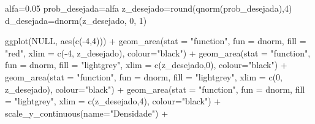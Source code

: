 \documentclass[
]{book}
\newenvironment{Shaded}{\begin{snugshade}}{\end{snugshade}}
\newcommand{\AttributeTok}[1]{\textcolor[rgb]{0.77,0.63,0.00}{#1}}
\newcommand{\ConstantTok}[1]{\textcolor[rgb]{0.00,0.00,0.00}{#1}}
\newcommand{\DecValTok}[1]{\textcolor[rgb]{0.00,0.00,0.81}{#1}}
\newcommand{\FloatTok}[1]{\textcolor[rgb]{0.00,0.00,0.81}{#1}}
\newcommand{\FunctionTok}[1]{\textcolor[rgb]{0.00,0.00,0.00}{#1}}
\newcommand{\NormalTok}[1]{#1}
\newcommand{\OtherTok}[1]{\textcolor[rgb]{0.56,0.35,0.01}{#1}}
\newcommand{\SpecialCharTok}[1]{\textcolor[rgb]{0.00,0.00,0.00}{#1}}
\newcommand{\StringTok}[1]{\textcolor[rgb]{0.31,0.60,0.02}{#1}}
\begin{document}
\begin{Shaded}
\begin{Highlighting}[]
\NormalTok{alfa}\OtherTok{=}\FloatTok{0.05}
\NormalTok{prob\_desejada}\OtherTok{=}\NormalTok{alfa}
\NormalTok{z\_desejado}\OtherTok{=}\FunctionTok{round}\NormalTok{(}\FunctionTok{qnorm}\NormalTok{(prob\_desejada),}\DecValTok{4}\NormalTok{)}
\NormalTok{d\_desejada}\OtherTok{=}\FunctionTok{dnorm}\NormalTok{(z\_desejado, }\DecValTok{0}\NormalTok{, }\DecValTok{1}\NormalTok{)}





\FunctionTok{ggplot}\NormalTok{(}\ConstantTok{NULL}\NormalTok{, }\FunctionTok{aes}\NormalTok{(}\FunctionTok{c}\NormalTok{(}\SpecialCharTok{{-}}\DecValTok{4}\NormalTok{,}\DecValTok{4}\NormalTok{))) }\SpecialCharTok{+}
  \FunctionTok{geom\_area}\NormalTok{(}\AttributeTok{stat =} \StringTok{"function"}\NormalTok{, }
            \AttributeTok{fun =}\NormalTok{ dnorm, }
            \AttributeTok{fill =} \StringTok{"red"}\NormalTok{, }
            \AttributeTok{xlim =} \FunctionTok{c}\NormalTok{(}\SpecialCharTok{{-}}\DecValTok{4}\NormalTok{, z\_desejado),}
            \AttributeTok{colour=}\StringTok{"black"}\NormalTok{) }\SpecialCharTok{+}
  \FunctionTok{geom\_area}\NormalTok{(}\AttributeTok{stat =} \StringTok{"function"}\NormalTok{, }
            \AttributeTok{fun =}\NormalTok{ dnorm, }
            \AttributeTok{fill =} \StringTok{"lightgrey"}\NormalTok{, }
            \AttributeTok{xlim =} \FunctionTok{c}\NormalTok{(z\_desejado,}\DecValTok{0}\NormalTok{),}
            \AttributeTok{colour=}\StringTok{"black"}\NormalTok{) }\SpecialCharTok{+}
  \FunctionTok{geom\_area}\NormalTok{(}\AttributeTok{stat =} \StringTok{"function"}\NormalTok{, }
            \AttributeTok{fun =}\NormalTok{ dnorm, }
            \AttributeTok{fill =} \StringTok{"lightgrey"}\NormalTok{, }
            \AttributeTok{xlim =} \FunctionTok{c}\NormalTok{(}\DecValTok{0}\NormalTok{, z\_desejado),}
            \AttributeTok{colour=}\StringTok{"black"}\NormalTok{) }\SpecialCharTok{+}
  \FunctionTok{geom\_area}\NormalTok{(}\AttributeTok{stat =} \StringTok{"function"}\NormalTok{, }
            \AttributeTok{fun =}\NormalTok{ dnorm, }
            \AttributeTok{fill =} \StringTok{"lightgrey"}\NormalTok{, }
            \AttributeTok{xlim =} \FunctionTok{c}\NormalTok{(z\_desejado,}\DecValTok{4}\NormalTok{),}
            \AttributeTok{colour=}\StringTok{"black"}\NormalTok{) }\SpecialCharTok{+}
  \FunctionTok{scale\_y\_continuous}\NormalTok{(}\AttributeTok{name=}\StringTok{"Densidade"}\NormalTok{) }\SpecialCharTok{+}

\end{Highlighting}
\end{Shaded}
\end{document}
